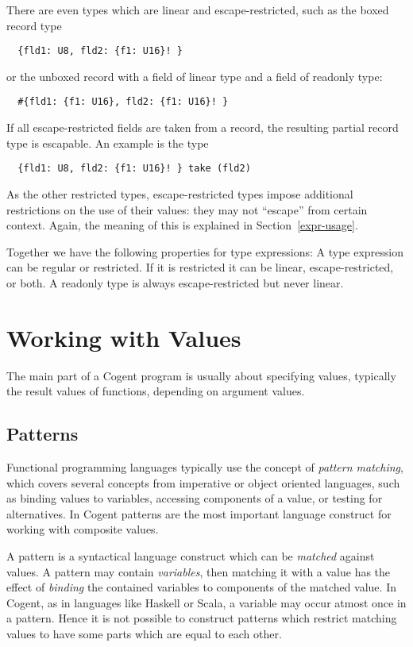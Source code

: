 \documentclass[a4paper]{report}
\newcommand{\cogent}{Cogent\xspace}
\begin{document}
There are even types which are linear and escape-restricted, such as the boxed record type
\begin{verbatim}
  {fld1: U8, fld2: {f1: U16}! }
\end{verbatim}
or the unboxed record with a field of linear type and a field of readonly type:
\begin{verbatim}
  #{fld1: {f1: U16}, fld2: {f1: U16}! }
\end{verbatim}

If all escape-restricted fields are taken from a record, the resulting partial record type is escapable.
An example is the type
\begin{verbatim}
  {fld1: U8, fld2: {f1: U16}! } take (fld2)
\end{verbatim}

As the other restricted types, escape-restricted types impose additional restrictions on the use of their values: they 
may not ``escape'' from certain context. Again, the meaning of this is explained in Section~\ref{expr-usage}.

Together we have the following properties for type expressions: A type expression can be regular or restricted. If it is restricted 
it can be linear, escape-restricted, or both. A readonly type is always escape-restricted but never linear.

\chapter{Working with Values}

The main part of a \cogent program is usually about specifying values, typically the result values of functions, depending on argument values. 

\section{Patterns}

Functional programming languages typically use the concept of \textit{pattern matching}, which covers several concepts from imperative or 
object oriented languages, such as binding values to variables, accessing components of a value, or testing for alternatives. In \cogent 
patterns are the most important language construct for working with composite values.

A pattern is a syntactical language construct which can be \textit{matched} against values. A pattern may contain \textit{variables}, 
then matching it with a value has the effect of \textit{binding} the contained variables to components of the matched value. In \cogent, 
 as  in languages like Haskell or Scala, a variable may occur atmost once in a pattern. Hence it is not possible to construct patterns 
which restrict matching values to have some parts which are equal to each other.
\end{document}
